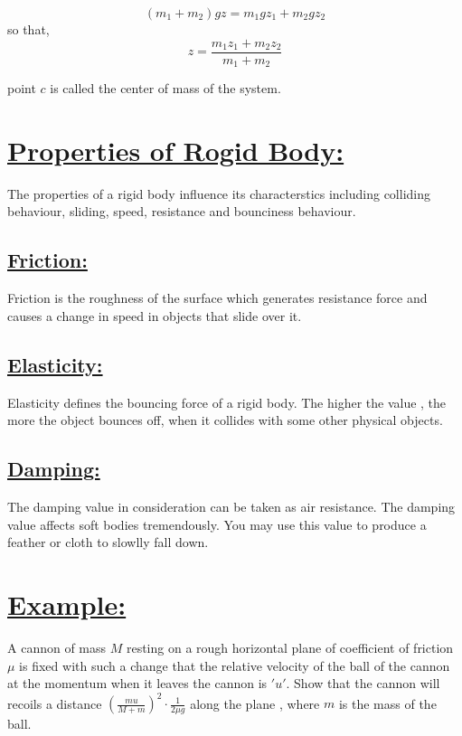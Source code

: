 \documentclass[12pt,a4paper]{article}
\begin{document}
    \[\left(m_1 + m_2\right)gz = m_1gz_1 + m_2gz_2\]
    so that,
    \[z = \frac{m_1z_1 + m_2z_2}{m_1 + m_2}\]

    point $c$ is called the center of mass of the system.

    \section*{\underline{Properties of Rogid Body:}}

    The properties of a rigid body influence its characterstics including colliding behaviour, sliding, speed, resistance and bounciness behaviour.

    \subsection*{\underline{Friction:}}

    Friction is the roughness of the surface which generates resistance force and causes a change in speed in objects that slide over it.

    \subsection*{\underline{Elasticity:}}

    Elasticity defines the bouncing force of a rigid body. The higher the value  , the more the object bounces off, when it collides with some other physical objects.

    \subsection*{\underline{Damping:}}

    The damping value in consideration can be taken as air resistance.
    The damping value affects soft bodies tremendously.
    You may use this value to produce a feather or cloth to slowlly fall down.\

    \pagebreak

    \section*{\underline{Example:}}

    A cannon of mass $M$ resting on a rough horizontal plane of coefficient of friction $\mu$ is fixed with such a change that the relative velocity of the ball of the cannon at the momentum when it leaves the cannon is $'u'$. Show that the cannon will recoils a distance $\left(\frac{mu}{M + m}\right)^2\cdot \frac{1}{2\mu g}$ along the plane , where $m$ is the mass of the ball.
\end{document}
